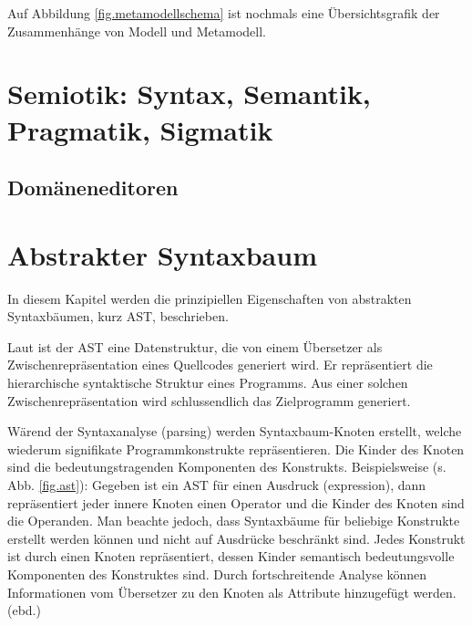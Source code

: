 Auf Abbildung \ref{fig.metamodellschema} ist nochmals eine Übersichtsgrafik der Zusammenhänge von
Modell und Metamodell.




\section{Semiotik: Syntax, Semantik, Pragmatik, Sigmatik}

\subsection{Domäneneditoren}


\section{Abstrakter Syntaxbaum}\label{sec.ast}

In diesem Kapitel werden die prinzipiellen Eigenschaften von abstrakten Syntaxbäumen,
kurz AST, beschrieben.

Laut \citep{dragonbook} ist der AST eine Datenstruktur, die von einem Übersetzer als
Zwischenrepräsentation eines Quellcodes generiert wird.
Er repräsentiert die hierarchische syntaktische Struktur eines Programms.
Aus einer solchen Zwischenrepräsentation wird schlussendlich das Zielprogramm generiert.

Wärend der Syntaxanalyse (parsing) werden Syntaxbaum-Knoten erstellt, welche wiederum
signifikate Programmkonstrukte repräsentieren.
Die Kinder des Knoten sind die bedeutungstragenden Komponenten des Konstrukts.
Beispielsweise (s. Abb. \ref{fig.ast}): Gegeben ist ein AST für einen Ausdruck (expression),
dann repräsentiert jeder innere Knoten einen Operator und die Kinder des Knoten
sind die Operanden.
Man beachte jedoch, dass Syntaxbäume für beliebige Konstrukte erstellt werden können
und nicht auf Ausdrücke beschränkt sind.
Jedes Konstrukt ist durch einen Knoten repräsentiert, dessen Kinder semantisch
bedeutungsvolle Komponenten des Konstruktes sind.
Durch fortschreitende Analyse können Informationen vom Übersetzer
zu den Knoten als Attribute hinzugefügt werden. (ebd.)


